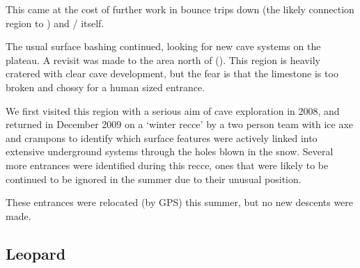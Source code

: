 This came at the cost of further work in bounce trips down  (the likely connection region to ) and  /  itself.

The usual surface bashing continued, looking for new cave systems on the
plateau. A revisit was made to the area north of  (). This region is
heavily cratered with clear cave development, but the fear is that the
limestone is too broken and chossy for a human sized entrance.

We first visited this region with a serious aim of cave exploration in
2008, and returned in December 2009 on a `winter recce' by a two person
team with ice axe and crampons to identify which surface features were
actively linked into extensive underground systems through the holes
blown in the snow. Several more entrances were identified during this
recce, ones that were likely to be continued to be ignored in the summer
due to their unusual position.

These entrances were relocated (by GPS) this summer, but no new descents were made.


\subsection{Leopard}

